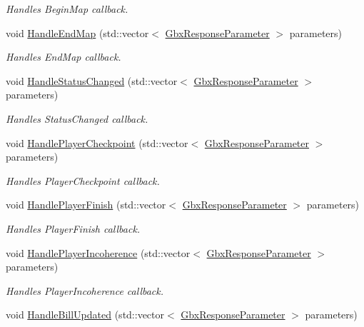 \begin{DoxyCompactItemize}
\begin{DoxyCompactList}\small\item\em Handles Begin\-Map callback. \end{DoxyCompactList}\item 
void \hyperlink{classCallBackManager_ac31e15ec293f178222e8f73dbce963da}{Handle\-End\-Map} (std\-::vector$<$ \hyperlink{classGbxResponseParameter}{Gbx\-Response\-Parameter} $>$ parameters)
\begin{DoxyCompactList}\small\item\em Handles End\-Map callback. \end{DoxyCompactList}\item 
void \hyperlink{classCallBackManager_acadb67344d217a028fe21163bf74e5cd}{Handle\-Status\-Changed} (std\-::vector$<$ \hyperlink{classGbxResponseParameter}{Gbx\-Response\-Parameter} $>$ parameters)
\begin{DoxyCompactList}\small\item\em Handles Status\-Changed callback. \end{DoxyCompactList}\item 
void \hyperlink{classCallBackManager_a350cfbe5f81c1039c8db53e0d6fb5ec5}{Handle\-Player\-Checkpoint} (std\-::vector$<$ \hyperlink{classGbxResponseParameter}{Gbx\-Response\-Parameter} $>$ parameters)
\begin{DoxyCompactList}\small\item\em Handles Player\-Checkpoint callback. \end{DoxyCompactList}\item 
void \hyperlink{classCallBackManager_aef1c327689b54fa2323ab5508b561c43}{Handle\-Player\-Finish} (std\-::vector$<$ \hyperlink{classGbxResponseParameter}{Gbx\-Response\-Parameter} $>$ parameters)
\begin{DoxyCompactList}\small\item\em Handles Player\-Finish callback. \end{DoxyCompactList}\item 
void \hyperlink{classCallBackManager_a8e3a29366a205d0fbeb2bafb4226d0bd}{Handle\-Player\-Incoherence} (std\-::vector$<$ \hyperlink{classGbxResponseParameter}{Gbx\-Response\-Parameter} $>$ parameters)
\begin{DoxyCompactList}\small\item\em Handles Player\-Incoherence callback. \end{DoxyCompactList}\item 
void \hyperlink{classCallBackManager_a04ae5c8b9c11709fe19229037f891902}{Handle\-Bill\-Updated} (std\-::vector$<$ \hyperlink{classGbxResponseParameter}{Gbx\-Response\-Parameter} $>$ parameters)

\end{DoxyCompactItemize}
